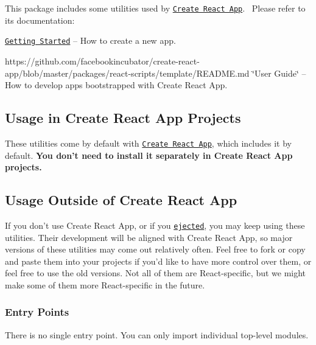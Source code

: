 This package includes some utilities used by \href{https://github.com/facebookincubator/create-react-app}{\tt Create React App}.~\newline
 Please refer to its documentation\+:


\begin{DoxyItemize}
\item \href{https://github.com/facebookincubator/create-react-app/blob/master/README.md#getting-started}{\tt Getting Started} – How to create a new app.
\item https\+://github.com/facebookincubator/create-\/react-\/app/blob/master/packages/react-\/scripts/template/\+R\+E\+A\+D\+M\+E.\+md \char`\"{}\+User Guide\char`\"{} – How to develop apps bootstrapped with Create React App.
\end{DoxyItemize}

\subsection*{Usage in Create React App Projects}

These utilities come by default with \href{https://github.com/facebookincubator/create-react-app}{\tt Create React App}, which includes it by default. {\bfseries You don’t need to install it separately in Create React App projects.}

\subsection*{Usage Outside of Create React App}

If you don’t use Create React App, or if you \href{https://github.com/facebookincubator/create-react-app/blob/master/packages/react-scripts/template/README.md#npm-run-eject}{\tt ejected}, you may keep using these utilities. Their development will be aligned with Create React App, so major versions of these utilities may come out relatively often. Feel free to fork or copy and paste them into your projects if you’d like to have more control over them, or feel free to use the old versions. Not all of them are React-\/specific, but we might make some of them more React-\/specific in the future.

\subsubsection*{Entry Points}

There is no single entry point. You can only import individual top-\/level modules.

